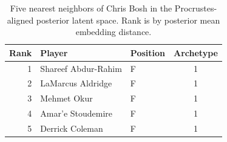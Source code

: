 \begin{table}[htbp]
  \centering\small
  \begin{tabular}{rllc}
    \toprule
    Rank & Player & Position & Archetype \\
    \midrule
    1 & Shareef Abdur-Rahim & F & 1 \\
    2 & LaMarcus Aldridge & F & 1 \\
    3 & Mehmet Okur & F & 1 \\
    4 & Amar'e Stoudemire & F & 1 \\
    5 & Derrick Coleman & F & 1 \\
    \bottomrule
  \end{tabular}
  \caption{Five nearest neighbors of Chris Bosh in the Procrustes-aligned posterior latent space. Rank is by posterior mean embedding distance.}
  \label{tab:Chris_Bosh_neighbors}
\end{table}

